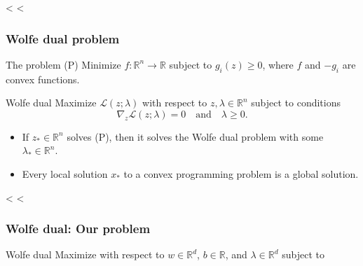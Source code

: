 \documentclass{beamer}
\begin{document}
<%
<%
\begin{frame}[c]\frametitle{Wolfe dual problem}
	\begin{block}{The problem (P)}
		Minimize $f: \mathbb{R}^n \to \mathbb{R}$ subject to $g_i(z) \geq 0$, where $f$ and $-g_i$ are convex functions.
	\end{block}
	\vfill
	\pause
	\begin{block}{Wolfe dual}
		Maximize $\mathscr{L}(z;\lambda)$ with respect to $z,\lambda\in\mathbb{R}^n$ subject to conditions
		\[
			\nabla_{\!\!z} \mathscr{L}(z;\lambda) = 0 \quad \text{and} \quad \lambda \geq 0.
		\]
	\end{block}
	\vfill
	\pause
	\begin{block}{}
		\begin{itemize}
			\item If $z_* \in \mathbb{R}^n$ solves (P), then it solves the Wolfe dual problem with some $\lambda_* \in \mathbb{R}^n$.
			\item Every local solution $x_*$ to a convex programming problem is a global solution.
		\end{itemize}
	\end{block}
\end{frame}

<%
<%
\begin{frame}[c]\frametitle{Wolfe dual: Our problem}
	\begin{block}{Wolfe dual}
		Maximize
		\only<1>{
		\[
			\mathscr{L}(w,b;\lambda) = \frac{1}{2}\|w\|^2 - \sum_{i=1}^\ell \lambda_i y_i (w \cdot x_i + b) + \sum_{i=1}^\ell \lambda_i
		\]
		}
		\only<2>{
		\[
			\mathscr{L}(w,b;\lambda) = \sum_{i=1}^\ell \lambda_i - \frac{1}{2} \sum_{i,j=1}^\ell \lambda_i \lambda_j y_i y_j \, x_i \cdot x_j
		\]
		}
		with respect to $w\in\mathbb{R}^d$, $b \in \mathbb{R}$, and $\lambda\in\mathbb{R}^d$ subject to
		\only<1>{
			\[
				w = \sum_{i=1}^\ell \lambda_i y_i x_i, \quad \sum_{i=1}^\ell \lambda_i y_i = 0, \quad \text{and} \quad \lambda \geq 0.
			\]
		}
		\only<2>{
			\[
				\left( w = \sum_{i=1}^\ell \lambda_i y_i x_i \right), \quad \sum_{i=1}^\ell \lambda_i y_i = 0, \quad \text{and} \quad \lambda \geq 0.
			\]
		}
	\end{block}
\end{frame}
\end{document}
